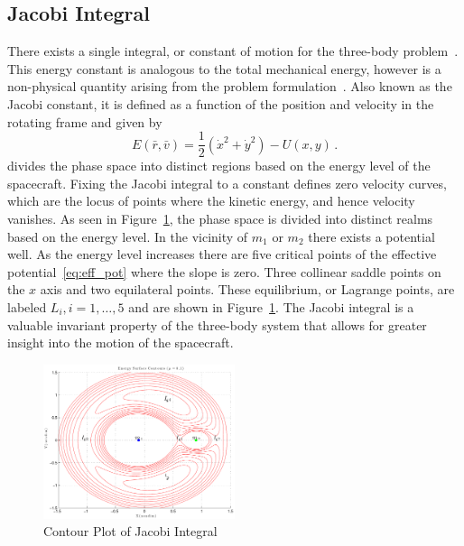 \subsection{Jacobi Integral}
There exists a single integral, or constant of motion for the three-body problem~\cite{lanczos1970,szebehely1967}.
This energy constant is analogous to the total mechanical energy, however is a non-physical quantity arising from the problem formulation~\cite{szebehely1967}.
Also known as the Jacobi constant, it is defined as a function of the position and velocity in the rotating frame and given by
\begin{equation}
	E\left( \bar{r} , \bar{v} \right) = \frac{1}{2}\left( \dot{x}^2 + \dot{y}^2\right) - U\left(x,y \right) \, .
	\label{eq:jacobi}
\end{equation}
 divides the phase space into distinct regions based on the energy level of the spacecraft.
Fixing the Jacobi integral to a constant defines zero velocity curves, which are the locus of points where the kinetic energy, and hence velocity vanishes.
As seen in Figure~\ref{fig:energy_contour}, the phase space is divided into distinct realms based on the energy level.
In the vicinity of \( m_1\) or \(m_2\) there exists a potential well. 
As the energy level increases there are five critical points of the effective potential~\cref{eq:eff_pot} where the slope is zero.
Three collinear saddle points on the \(x\) axis and two equilateral points.
These equilibrium, or Lagrange points, are labeled \( L_i, i = 1, \hdots, 5 \) and are shown in Figure~\ref{fig:energy_contour}.
The Jacobi integral is a valuable invariant property of the three-body system that allows for greater insight into the motion of the spacecraft.
\begin{figure}[htbp]
	\centering
	\includegraphics[width=0.5\textwidth]{figures/2015_AAS/energy_contours}
	\caption{Contour Plot of Jacobi Integral}
	\label{fig:energy_contour}
\end{figure} 


